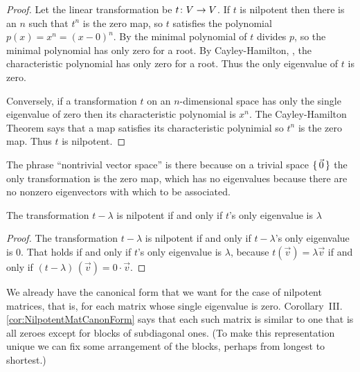 \begin{proof}
Let the linear transformation be $\mbox{$t\colon V\to V$}$.
If $t$ is nilpotent then there is an $n$ such that $t^n$ is the zero map,
so $t$ satisfies the polynomial $p(x)=x^n=(x-0)^n$.
By  the minimal polynomial of 
$t$ divides $p$, so the minimal polynomial has only zero for a root.
By Cayley-Hamilton, ,
the characteristic polynomial has only zero for a root.
Thus the only eigenvalue of $t$ is zero.

Conversely, if a transformation \( t \) on an
\( n \)-dimensional space has only the single eigenvalue of zero 
then its characteristic polynomial is \( x^n \). 
The Cayley-Hamilton Theorem says that a map satisfies its
characteristic polynimial so \( t^n \) is the zero map.
Thus $t$ is nilpotent.
\end{proof}

\noindent The phrase ``nontrivial vector space'' is there because on a trivial
space $\mbox{$\{\,\vec{0}\,\}$}$ the only transformation is the zero map, which has
no eigenvalues because there are no nonzero eigenvectors with which to
be associated.

\begin{corollary}
The transformation $t-\lambda$ is nilpotent if and only if 
$t$'s only eigenvalue is $\lambda$   
\end{corollary}

\begin{proof}
The transformation \( t-\lambda \) is nilpotent if and only if
$t-\lambda$'s only eigenvalue is \( 0 \).
That holds if and only if $t$'s only eigenvalue is $\lambda$, because
\( t(\vec{v})=\lambda\vec{v} \) if and 
only if \( (t-\lambda)\,(\vec{v})=0\cdot\vec{v} \).
\end{proof}

We already have the canonical form that we want for 
the case of nilpotent matrices, 
that is, for each matrix whose single eigenvalue is zero.
Corollary~III.\ref{cor:NilpotentMatCanonForm} says that each 
such matrix is similar to one that is all
zeroes except for blocks of subdiagonal ones.
(To make this representation unique we can fix some arrangement of
the blocks, perhaps from longest to shortest.)


